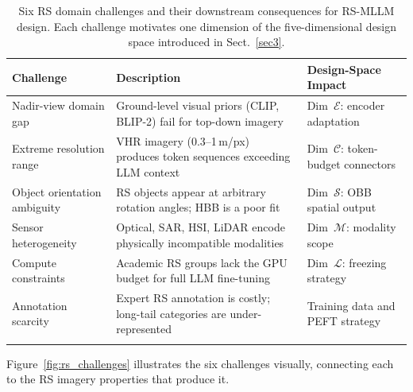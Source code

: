 \begin{table}[h]
\caption{Six RS domain challenges and their downstream consequences for
RS-MLLM design. Each challenge motivates one dimension of the five-dimensional
design space introduced in Sect.~\ref{sec3}.}\label{tab:rs_challenges}
\small\setlength\tabcolsep{4pt}
\begin{tabular*}{\textwidth}{@{\extracolsep\fill}p{2.8cm}p{4.2cm}p{3.8cm}}
\toprule
\textbf{Challenge} & \textbf{Description} & \textbf{Design-Space Impact} \\
\midrule
Nadir-view domain gap &
  Ground-level visual priors (CLIP, BLIP-2) fail for top-down imagery &
  Dim~$\mathcal{E}$: encoder adaptation \\[3pt]
Extreme resolution range &
  VHR imagery (0.3--1\,m/px) produces token sequences exceeding LLM context &
  Dim~$\mathcal{C}$: token-budget connectors \\[3pt]
Object orientation ambiguity &
  RS objects appear at arbitrary rotation angles; HBB is a poor fit &
  Dim~$\mathcal{S}$: OBB spatial output \\[3pt]
Sensor heterogeneity &
  Optical, SAR, HSI, LiDAR encode physically incompatible modalities &
  Dim~$\mathcal{M}$: modality scope \\[3pt]
Compute constraints &
  Academic RS groups lack the GPU budget for full LLM fine-tuning &
  Dim~$\mathcal{L}$: freezing strategy \\[3pt]
Annotation scarcity &
  Expert RS annotation is costly; long-tail categories are under-represented &
  Training data and PEFT strategy \\
\botrule
\end{tabular*}
\end{table}

Figure~\ref{fig:rs_challenges} illustrates the six challenges visually,
connecting each to the RS imagery properties that produce it.

